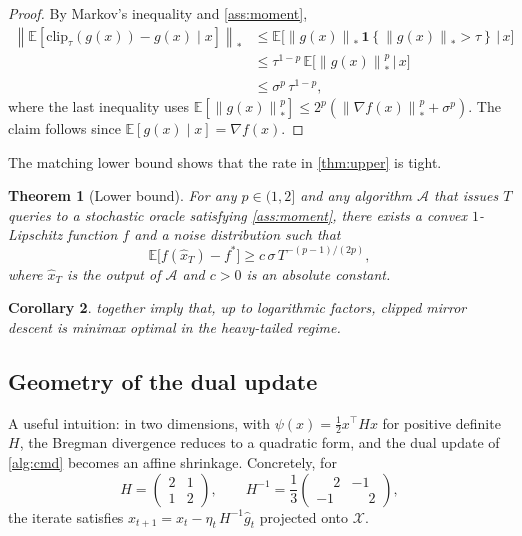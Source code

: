 \documentclass[11pt,a4paper]{article}
\theoremstyle{plain}
\newtheorem{theorem}{Theorem}[section]
\newtheorem{corollary}[theorem]{Corollary}
\theoremstyle{definition}
\theoremstyle{remark}
\newcommand{\E}{\mathbb{E}}
\newcommand{\norm}[1]{\left\lVert#1\right\rVert}
\newcommand{\set}[1]{\left\{#1\right\}}
\begin{document}
\begin{proof}
By Markov's inequality and \cref{ass:moment},
\begin{align}
    \norm{\E[\mathrm{clip}_\tau(g(x)) - g(x) \mid x]}_*
    &\leq \E\bigl[\norm{g(x)}_* \, \mathbf{1}\set{\norm{g(x)}_* > \tau}
          \,\big|\, x\bigr] \nonumber \\
    &\leq \tau^{1-p} \, \E\bigl[\norm{g(x)}_*^p \,\big|\, x\bigr] \nonumber \\
    &\leq \sigma^p \, \tau^{1-p}, \label{eq:bias-bound}
\end{align}
where the last inequality uses
$\E[\norm{g(x)}_*^p] \leq 2^p (\norm{\nabla f(x)}_*^p + \sigma^p)$. The claim
follows since $\E[g(x) \mid x] = \nabla f(x)$.
\end{proof}

The matching lower bound shows that the rate in \cref{thm:upper} is tight.

\begin{theorem}[Lower bound]
\label{thm:lower}
For any $p \in (1, 2]$ and any algorithm $\mathcal{A}$ that issues $T$ queries
to a stochastic oracle satisfying \cref{ass:moment}, there exists a convex
$1$-Lipschitz function $f$ and a noise distribution such that
\begin{equation*}
    \E\bigl[ f(\hat{x}_T) - f^* \bigr]
    \geq c \, \sigma \, T^{-(p-1)/(2p)},
\end{equation*}
where $\hat{x}_T$ is the output of $\mathcal{A}$ and $c > 0$ is an absolute
constant.
\end{theorem}

\begin{corollary}
\label{cor:minimax}
 together imply that, up to logarithmic factors,
clipped mirror descent is minimax optimal in the heavy-tailed regime.
\end{corollary}

\subsection{Geometry of the dual update}
\label{sec:geometry}

A useful intuition: in two dimensions, with $\psi(x) = \tfrac{1}{2}x^\top H x$
for positive definite $H$, the Bregman divergence reduces to a quadratic form,
and the dual update of \cref{alg:cmd} becomes an affine shrinkage. Concretely,
for
\begin{equation*}
    H = \begin{pmatrix} 2 & 1 \\ 1 & 2 \end{pmatrix},
    \qquad
    H^{-1} = \frac{1}{3}\begin{pmatrix} \phantom{-}2 & -1 \\ -1 & \phantom{-}2 \end{pmatrix},
\end{equation*}
the iterate satisfies $x_{t+1} = x_t - \eta_t \, H^{-1} \hat g_t$ projected
onto $\mathcal{X}$.
\end{document}
